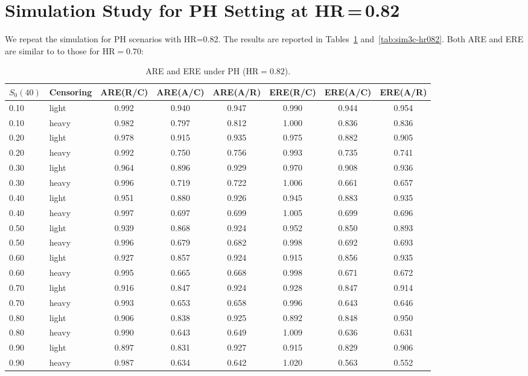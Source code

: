\documentclass[12pt]{article}
\begin{document}
\section{Simulation Study for PH Setting at HR\,=\,0.82}
\label{sec:appendix-hr082}

We repeat the simulation for PH scenarios with HR=0.82. The results are reported in Tables~\ref{tab:sim3a-hr082} and~\ref{tab:sim3c-hr082}.
Both ARE and ERE are similar to to those for HR$=0.70$:

\begin{table}[h!]
\centering
\small
\caption{ARE and ERE under PH (HR$=0.82$).}
\label{tab:sim3a-hr082}
\setlength{\tabcolsep}{4pt}
\begin{tabular}{llcccccc}
\hline
$S_0(40)$ & Censoring & ARE(R/C) & ARE(A/C) & ARE(A/R) & ERE(R/C) & ERE(A/C) & ERE(A/R) \\
\hline
0.10 & light & 0.992 & 0.940 & 0.947 & 0.990 & 0.944 & 0.954 \\
0.10 & heavy & 0.982 & 0.797 & 0.812 & 1.000 & 0.836 & 0.836 \\
0.20 & light & 0.978 & 0.915 & 0.935 & 0.975 & 0.882 & 0.905 \\
0.20 & heavy & 0.992 & 0.750 & 0.756 & 0.993 & 0.735 & 0.741 \\
0.30 & light & 0.964 & 0.896 & 0.929 & 0.970 & 0.908 & 0.936 \\
0.30 & heavy & 0.996 & 0.719 & 0.722 & 1.006 & 0.661 & 0.657 \\
0.40 & light & 0.951 & 0.880 & 0.926 & 0.945 & 0.883 & 0.935 \\
0.40 & heavy & 0.997 & 0.697 & 0.699 & 1.005 & 0.699 & 0.696 \\
0.50 & light & 0.939 & 0.868 & 0.924 & 0.952 & 0.850 & 0.893 \\
0.50 & heavy & 0.996 & 0.679 & 0.682 & 0.998 & 0.692 & 0.693 \\
0.60 & light & 0.927 & 0.857 & 0.924 & 0.915 & 0.856 & 0.935 \\
0.60 & heavy & 0.995 & 0.665 & 0.668 & 0.998 & 0.671 & 0.672 \\
0.70 & light & 0.916 & 0.847 & 0.924 & 0.928 & 0.847 & 0.914 \\
0.70 & heavy & 0.993 & 0.653 & 0.658 & 0.996 & 0.643 & 0.646 \\
0.80 & light & 0.906 & 0.838 & 0.925 & 0.892 & 0.848 & 0.950 \\
0.80 & heavy & 0.990 & 0.643 & 0.649 & 1.009 & 0.636 & 0.631 \\
0.90 & light & 0.897 & 0.831 & 0.927 & 0.915 & 0.829 & 0.906 \\
0.90 & heavy & 0.987 & 0.634 & 0.642 & 1.020 & 0.563 & 0.552 \\
\hline
\end{tabular}
\end{table}
\end{document}
